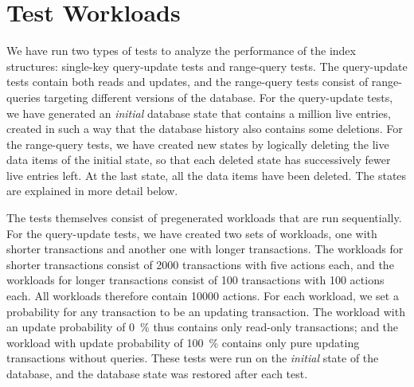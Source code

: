 \section{Test Workloads}
\label{sec:performance:test-data}

We have run two types of tests to analyze the performance of the index
structures: single-key query-update tests and range-query tests.
The query-update tests contain both reads and updates, and the range-query
tests consist of range-queries targeting different versions of the database.
For the query-update tests, we have generated an \emph{initial} database
state that contains a million live entries, created in such a way that the
database history also contains some deletions. 
For the range-query tests, we have created new states by logically deleting
the live data items of the initial state, so that each deleted
state has successively fewer live entries left.
At the last state, all the data items have been deleted.
The states are explained in more detail below.

The tests themselves consist of pregenerated workloads that are run
sequentially.
For the query-update tests, we have created two sets of workloads, one with
shorter transactions and another one with longer transactions.
The workloads for shorter transactions consist of \num{2000}
transactions with five actions each, and the workloads for longer
transactions consist of \num{100} transactions with \num{100} actions each.
All workloads therefore contain \num{10000} actions. 
For each workload, we set a probability for any transaction to be an
updating transaction. 
The workload with an update probability of \SI{0}{\percent} thus contains
only read-only transactions; and the workload with update probability of
\SI{100}{\percent} contains only pure updating transactions without
queries. 
These tests were run on the \emph{initial} state of the database,
and the database state was restored after each test.

